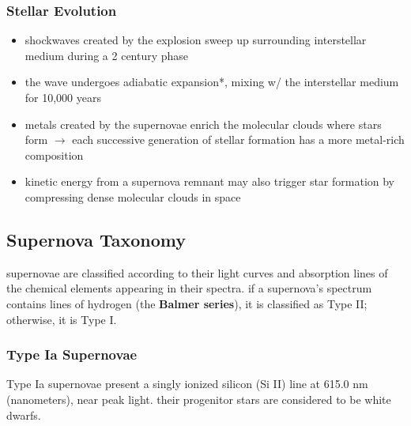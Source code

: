 \subsubsection{Stellar Evolution}
\begin{itemize}[noitemsep]
	\item shockwaves created by the explosion sweep up surrounding interstellar medium during a 2 century phase
	\item the wave undergoes \gls{adiabatic expansion}*, mixing w/ the interstellar medium for 10,000 years
	\item metals created by the supernovae enrich the molecular clouds where stars form $\rightarrow$ each successive generation of stellar formation has a more metal-rich composition
	\item kinetic energy from a supernova remnant may also trigger star formation  by compressing dense molecular clouds in space
\end{itemize}

\subsection{Supernova Taxonomy}
supernovae are classified according to their light curves and absorption lines of the chemical elements appearing in their spectra. if a supernova's spectrum contains lines of hydrogen (the \textbf{Balmer series}), it is classified as Type II; otherwise, it is Type I.
\subsubsection{Type Ia Supernovae}
Type Ia supernovae present a singly ionized silicon (Si II) line at 615.0 nm (nanometers), near peak light. their progenitor stars are considered to be white dwarfs.

